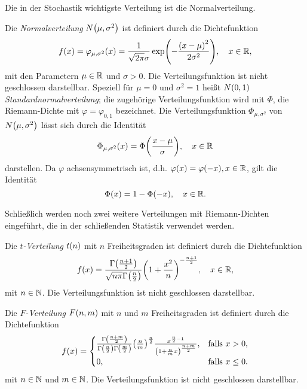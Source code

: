 \documentclass{lecture}
\begin{document}
    Die in der Stochastik wichtigste Verteilung ist die Normalverteilung.

    \begin{definition}
        Die \emph{Normalverteilung} \(N\parentheses*{\mu, \sigma^2}\) ist definiert durch die Dichtefunktion
        \[
            f\parentheses*{x} = \varphi_{\mu, \sigma^2}\parentheses*{x} = \frac{1}{\sqrt{2\pi}\sigma}\exp\parentheses*{-\frac{\parentheses*{x - \mu}^2}{2\sigma^2}}, \quad x \in \R,
        \]
        mit den Parametern \(\mu \in \mathbb{R}\) und \(\sigma > 0\).
        Die Verteilungsfunktion ist nicht geschlossen darstellbar.
        Speziell für \(\mu = 0\) und \(\sigma^2 = 1\) heißt \(N\parentheses*{0, 1}\) \emph{Standardnormalverteilung}; die zugehörige Verteilungsfunktion wird mit \(\Phi\), die Riemann-Dichte mit \(\varphi = \varphi_{0, 1}\) bezeichnet.
        Die Verteilungsfunktion \(\Phi_{\mu, \sigma^2}\) von \(N\parentheses*{\mu, \sigma^2}\) lässt sich durch die Identität
        \[
            \Phi_{\mu, \sigma^2}\parentheses*{x} = \Phi\parentheses*{\frac{x - \mu}{\sigma}}, \quad x \in \R
        \]
        darstellen.
        Da \(\varphi\) achsensymmetrisch ist, d.h. \(\varphi\parentheses*{x} = \varphi\parentheses*{-x}, x \in \R\), gilt die Identität
        \[
            \Phi\parentheses*{x} = 1 - \Phi\parentheses*{-x}, \quad x \in \R.
        \]
    \end{definition}

    Schließlich werden noch zwei weitere Verteilungen mit Riemann-Dichten eingeführt, die in der schließenden Statistik verwendet werden.

    \begin{definition}
        Die \emph{\(t\)-Verteilung} \(t\parentheses*{n}\) mit \(n\) Freiheitsgraden ist definiert durch die Dichtefunktion
        \[
            f\parentheses*{x} = \frac{\Gamma\parentheses*{\frac{n + 1}{2}}}{\sqrt{n\pi}\Gamma\parentheses*{\frac{n}{2}}}\parentheses*{1 + \frac{x^2}{n}}^{-\frac{n + 1}{2}}, \quad x \in \R,
        \]
        mit \(n \in \mathbb{N}\).
        Die Verteilungsfunktion ist nicht geschlossen darstellbar.
    \end{definition}

    \begin{definition}
        Die \emph{\(F\)-Verteilung} \(F\parentheses*{n, m}\) mit \(n\) und \(m\) Freiheitsgraden ist definiert durch die Dichtefunktion
        \[
            f\parentheses*{x} = \begin{cases}
                \frac{\Gamma\parentheses*{\frac{n + m}{2}}}{\Gamma\parentheses*{\frac{n}{2}}\Gamma\parentheses*{\frac{m}{2}}}\parentheses*{\frac{n}{m}}^{\frac{n}{2}}\frac{x^{\frac{n}{2} - 1}}{\parentheses*{1 + \frac{n}{m}x}^{\frac{n + m}{2}}}, & \text{falls }x > 0,\\
                0, & \text{falls }x \le 0.
            \end{cases}
        \]
        mit \(n \in \mathbb{N}\) und \(m \in \mathbb{N}\). Die Verteilungsfunktion ist nicht geschlossen darstellbar.
    \end{definition}
\end{document}
